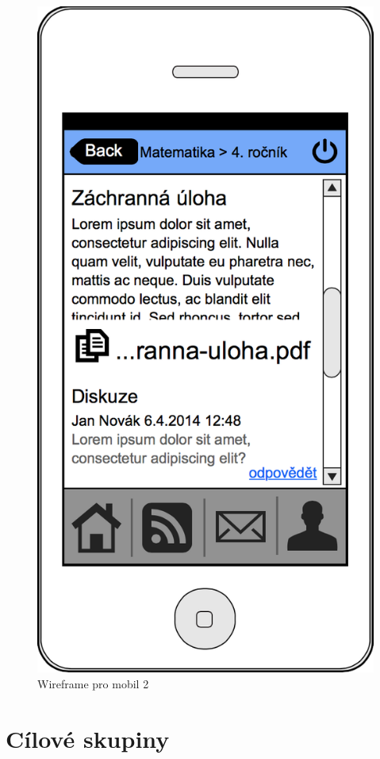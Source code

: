 \documentclass[thesis=B,czech]{FITthesis}[2012/06/26]
\begin{document}
\begin{figure}
	\includegraphics[scale=0.35]{wireframe_phone_tema.png}
	\caption{Wireframe pro mobil 2} \label{fig:wireframemobil2} 
\end{figure}


\section{Cílové skupiny}
\end{document}
